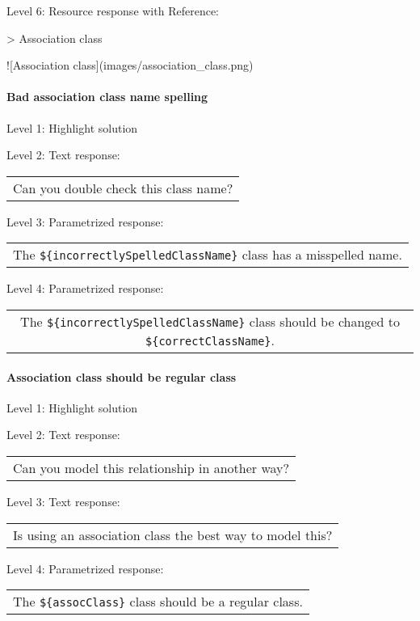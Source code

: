 \noindent Level 6: Resource response with Reference:

> Association class

![Association class](images/association_class.png)


\paragraph{Bad association class name spelling}

\noindent Level 1: Highlight solution \medskip

\noindent Level 2: Text response: \medskip

\begin{tabular}{|c}
Can you double check this class name?
\end{tabular} \medskip

\noindent Level 3: Parametrized response: \medskip

\begin{tabular}{|c}
The \verb|${incorrectlySpelledClassName}| class has a misspelled name.
\end{tabular} \medskip

\noindent Level 4: Parametrized response: \medskip

\begin{tabular}{|c}
The \verb|${incorrectlySpelledClassName}| class should be changed to \verb|${correctClassName}|.
\end{tabular} \medskip


\paragraph{Association class should be regular class}

\noindent Level 1: Highlight solution \medskip

\noindent Level 2: Text response: \medskip

\begin{tabular}{|c}
Can you model this relationship in another way?
\end{tabular} \medskip

\noindent Level 3: Text response: \medskip

\begin{tabular}{|c}
Is using an association class the best way to model this?
\end{tabular} \medskip

\noindent Level 4: Parametrized response: \medskip

\begin{tabular}{|c}
The \verb|${assocClass}| class should be a regular class.
\end{tabular} \medskip


